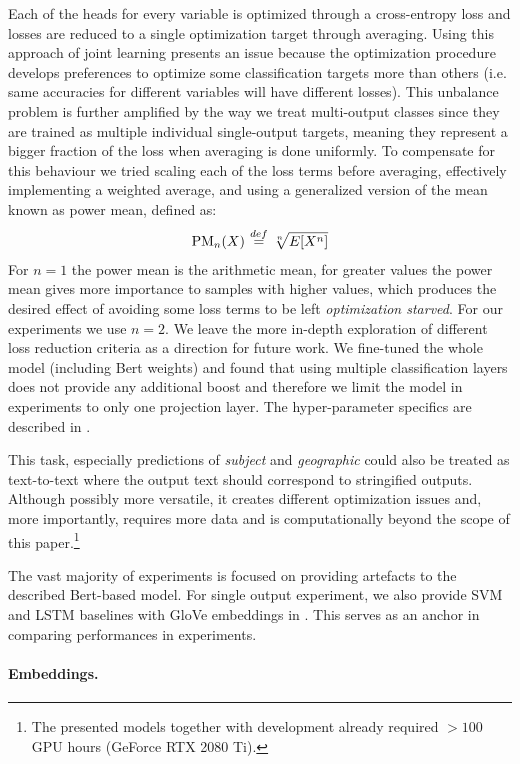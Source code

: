Each of the heads for every variable is optimized through a cross-entropy loss and losses are reduced to a single optimization target through averaging.
Using this approach of joint learning presents an issue because the optimization procedure develops preferences to optimize some classification targets more than others (i.e. same accuracies for different variables will have different losses).
This unbalance problem is further amplified by the way we treat multi-output classes since they are trained as multiple individual single-output targets, meaning they represent a bigger fraction of the loss when averaging is done uniformly. 
To compensate for this behaviour we tried scaling each of the loss terms before averaging, effectively implementing a weighted average, and using a generalized version of the mean known as power mean, defined as:
$$\text{PM}_n(X) \defeq \sqrt[n]{E[X^n]}$$
For $n=1$ the power mean is the arithmetic mean, for greater values 
the power mean gives more importance to samples with higher values, which produces the desired effect of avoiding some loss terms to be left \textit{optimization starved}.
For our experiments we use $n=2$.
We leave the more in-depth exploration of different loss reduction criteria as a direction for future work.
We fine-tuned the whole model (including Bert weights) and found that using multiple classification layers does not provide any additional boost and therefore we limit the model in experiments to only one projection layer.
The hyper-parameter specifics are described in .

This task, especially predictions of \emph{subject} and \emph{geographic} could also be treated as text-to-text where the output text should correspond to stringified outputs.
Although possibly more versatile, it creates different optimization issues and, more importantly, requires more data and is computationally beyond the scope of this paper.\footnote{
The presented models together with development already required $>100$ GPU hours (GeForce RTX 2080 Ti).
}

The vast majority of experiments is focused on providing artefacts to the described Bert-based model.
For single output experiment, we also provide SVM \cite{svm} and LSTM \cite{lstm} baselines with GloVe \cite{glove} embeddings in .
This serves as an anchor in comparing performances in experiments.

\paragraph{Embeddings.}

